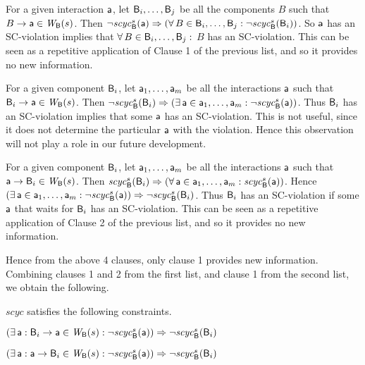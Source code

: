 \item For a given interaction $\mathsf{a}$, let $\mathsf{B}_i,\ldots,\mathsf{B}_j$ be all the components $B$ such that $B \rightarrow \mathsf{a} \in \mathit{W}_{\mathsf{B}}({s})$.
Then $\neg \mathit{scyc}_{\mathsf{B}}^{s}({\mathsf{a}}) \Rightarrow (\forall\, B \in \mathsf{B}_i,\ldots,\mathsf{B}_j: \neg \mathit{scyc}_{\mathsf{B}}^{s}({\mathsf{B}_i}))$.
So $\mathsf{a}$ has an SC-violation implies that $\forall\, B \in \mathsf{B}_i,\ldots,\mathsf{B}_j:$ $B$ has an SC-violation.
This can be seen as a repetitive application of Clause 1 of the previous list, and so it provides no new information.

\item For a given component $\mathsf{B}_i$, let $\mathsf{a}_1,\ldots, \mathsf{a}_m$ be all the interactions $\mathsf{a}$ such that $\mathsf{B}_i \rightarrow \mathsf{a} \in \mathit{W}_{\mathsf{B}}({s})$.
Then $\neg \mathit{scyc}_{\mathsf{B}}^{s}({\mathsf{B}_i}) \Rightarrow (\exists\, \mathsf{a} \in \mathsf{a}_1,\ldots,\mathsf{a}_m: \neg \mathit{scyc}_{\mathsf{B}}^{s}({\mathsf{a}}))$.
Thus $\mathsf{B}_i$ has an SC-violation implies that some $\mathsf{a}$ has an SC-violation. This is not useful, since it does not
determine the particular $\mathsf{a}$ with the violation. Hence this observation will not play a role in our future development.

\item For a given component $\mathsf{B}_i$, let $\mathsf{a}_1,\ldots, \mathsf{a}_m$ be all the interactions $\mathsf{a}$ such that $\mathsf{a} \rightarrow \mathsf{B}_i \in \mathit{W}_{\mathsf{B}}({s})$.
Then $\mathit{scyc}_{\mathsf{B}}^{s}({\mathsf{B}_i}) \Rightarrow (\forall\, \mathsf{a} \in \mathsf{a}_1,\ldots,\mathsf{a}_m: \mathit{scyc}_{\mathsf{B}}^{s}({\mathsf{a}}))$.
Hence $(\exists\, \mathsf{a} \in \mathsf{a}_1,\ldots,\mathsf{a}_m: \neg \mathit{scyc}_{\mathsf{B}}^{s}({\mathsf{a}})) \Rightarrow \neg \mathit{scyc}_{\mathsf{B}}^{s}({\mathsf{B}_i})$.
Thus $\mathsf{B}_i$ has an SC-violation if some $\mathsf{a}$ that waits for $\mathsf{B}_i$ has an SC-violation.
This can be seen as a repetitive application of Clause 2 of the previous list, and so it provides no new information.

\en
Hence from the above 4 clauses, only clause 1 provides new information. 
Combining clauses 1 and 2 from the first list, and clause 1 from the second list, we obtain the following. 


\label{prop:sc-membership}
$scyc$ satisfies the following constraints.
\bn

\item \label{prop:sc-membership:comp-out}
$(\exists\, \mathsf{a}: \mathsf{B}_i \rightarrow \mathsf{a} \in \mathit{W}_{\mathsf{B}}({s}) : \neg \mathit{scyc}_{\mathsf{B}}^{s}({\mathsf{a}})) \Rightarrow \neg \mathit{scyc}_{\mathsf{B}}^{s}({\mathsf{B}_i})$

\item \label{prop:sc-membership:comp-in}
$(\exists\, \mathsf{a}: \mathsf{a} \rightarrow \mathsf{B}_i \in \mathit{W}_{\mathsf{B}}({s}): \neg \mathit{scyc}_{\mathsf{B}}^{s}({\mathsf{a}})) \Rightarrow \neg \mathit{scyc}_{\mathsf{B}}^{s}({\mathsf{B}_i})$


